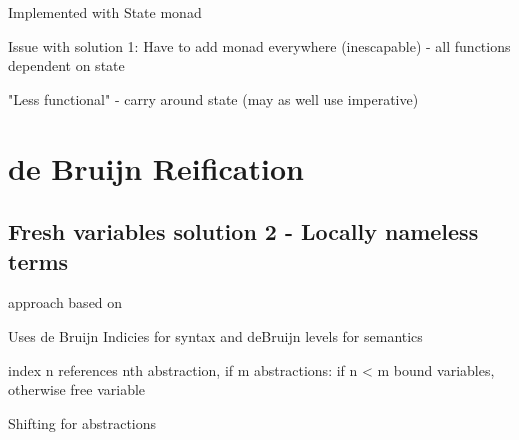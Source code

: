 Implemented with State monad

Issue with solution 1: Have to add monad everywhere (inescapable) - all functions dependent on state

"Less functional" - carry around state (may as well use imperative)
\section{de Bruijn Reification}
\subsection{Fresh variables solution 2 - Locally nameless terms}
approach based on \cite{deBruijn}

Uses de Bruijn Indicies for syntax and deBruijn levels for semantics

index n references nth abstraction,
if m abstractions: if n < m bound variables, otherwise free variable

Shifting for abstractions
